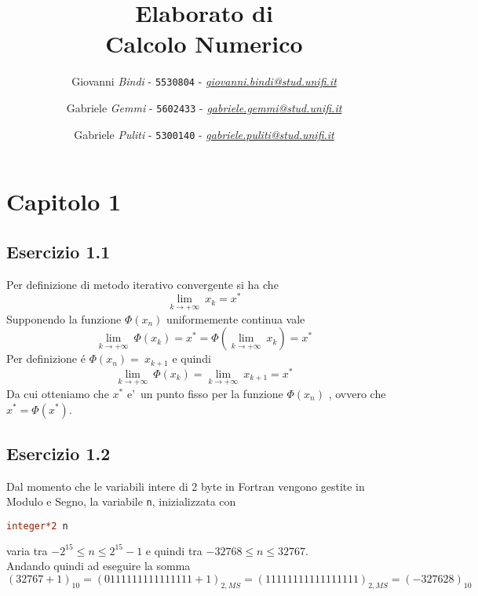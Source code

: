 \documentclass[a4paper]{article}
\begin{document}
 

\title{Elaborato di \\ \textbf{Calcolo Numerico}}

\author{Giovanni \emph{Bindi} - \texttt{5530804} - \href{mailto:giovanni.bindi@stud.unifi.it}{\textit{giovanni.bindi@stud.unifi.it}}
   \and Gabriele \emph{Gemmi} - \texttt{5602433} -
   \href{mailto:gabriele.gemmi@stud.unifi.it}{\textit{gabriele.gemmi@stud.unifi.it}}
   \and Gabriele \emph{Puliti} - \texttt{5300140} - \href{mailto:gabriele.puliti@stud.unifi.it}{\textit{gabriele.puliti@stud.unifi.it}}} 


\maketitle

\tableofcontents


\newpage
\section{\textbf{Capitolo 1}}

\subsection{\textbf{Esercizio 1.1}}
Per definizione di metodo iterativo convergente si ha che 
\[
	\lim_{k \to +\infty}\ x_k = x^* 
\]
Supponendo la funzione \( \Phi(x_n) \) uniformemente continua vale
\[ 
	\lim_{k \to +\infty}\ \Phi(x_k) = x^*  = \Phi ( \lim_{k \to +\infty}\ x_k ) = x^* 
\]
Per definizione \'e \( \Phi(x_n) = \ x_{k+1} \) e quindi
\[
	\lim_{k \to +\infty}\ \Phi(x_k) = \lim_{k \to +\infty} \ x_{k+1} = x^*	
\]
Da cui otteniamo che \( x^* \) e'\ un punto fisso per la funzione \( \Phi(x_n) \) , ovvero che \( x^* = \Phi(x^*) \).

\subsection{\textbf{Esercizio 1.2}}

Dal momento che le variabili intere di 2 byte in Fortran vengono gestite in Modulo e Segno, la variabile \texttt{n}, inizializzata con

\begin{lstlisting}[language=Fortran]
integer*2 n
\end{lstlisting}

varia tra \( - 2^{15} \leq n \leq 2^{15} - 1 \) e quindi tra  \( -32768 \leq n \leq 32767 \). \\
Andando quindi ad eseguire la somma \( (32767+1)_{10} = (0111111111111111 + 1)_{2,MS} = (11111111111111111)_{2,MS} = (-327628)_{10} \)
\end{document}
